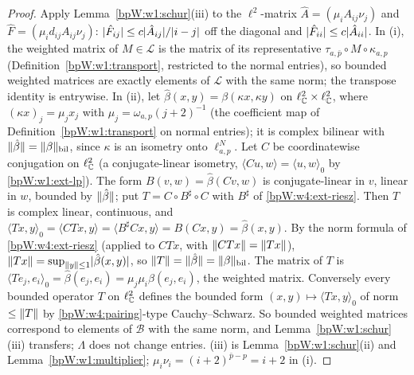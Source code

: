 \begin{proof}
\label{stepW:w4:schurtr}
Apply Lemma~\ref{bpW:w1:schur}(iii) to the $\ell^2$-matrix $\hat A=(\mu_iA_{ij}\nu_j)$ and $\hat F=(\mu_id_{ij}A_{ij}\nu_j)$:
$\lvert \hat F_{ij}\rvert\le c\lvert \hat A_{ij}\rvert/\lvert i-j\rvert$ off the diagonal and $\lvert \hat F_{ii}\rvert\le c\lvert \hat A_{ii}\rvert$.
\label{stepW:w4:schurrep}
In (i), the weighted matrix of $M\in\mathcal L$ is the matrix of its representative
$\tau_{a,\bar p}\circ M\circ\kappa_{a,p}$ (Definition~\ref{bpW:w1:transport}, restricted to the normal entries), so
bounded weighted matrices are exactly elements of $\mathcal L$ with the same norm; the transpose identity is
entrywise. In (ii), let $\hat\beta(x,y)=\beta(\kappa x,\kappa y)$ on $\ell^2_{\mathbb{C}}\times\ell^2_{\mathbb{C}}$, where $(\kappa x)_j=\mu_jx_j$ with
$\mu_j=\omega_{a,p}(j+2)^{-1}$ (the coefficient map of Definition~\ref{bpW:w1:transport} on normal entries); it is complex
bilinear with $\lVert \hat\beta\rVert=\lVert \beta\rVert_{\rm bil}$, since $\kappa$ is an isometry onto $\ell^N_{a,p}$. Let $C$ be
coordinatewise conjugation on $\ell^2_{\mathbb{C}}$ (a conjugate-linear isometry, $\langle Cu,w\rangle=\langle u,w\rangle_0$
by \ref{bpW:w1:ext-lp}). The form $B(v,w)=\hat\beta(Cv,w)$ is conjugate-linear in $v$, linear in $w$, bounded by
$\lVert \hat\beta\rVert$; put $T=C\circ B^\sharp\circ C$ with $B^\sharp$ of \ref{bpW:w4:ext-riesz}. Then $T$ is complex linear,
continuous, and $\langle Tx,y\rangle_0=\langle CTx,y\rangle=\langle B^\sharp Cx,y\rangle=B(Cx,y)=\hat\beta(x,y)$. By the
norm formula of \ref{bpW:w4:ext-riesz} (applied to $CTx$, with $\lVert CTx\rVert=\lVert Tx\rVert$),
$\lVert Tx\rVert=\sup_{\lVert y\rVert\le1}\lvert \hat\beta(x,y)\rvert$, so $\lVert T\rVert=\lVert \hat\beta\rVert=\lVert \beta\rVert_{\rm bil}$. The matrix of $T$ is
$\langle Te_j,e_i\rangle_0=\hat\beta(e_j,e_i)=\mu_j\mu_i\beta(e_j,e_i)$, the weighted matrix. Conversely every bounded
operator $T$ on $\ell^2_{\mathbb{C}}$ defines the bounded form $(x,y)\mapsto\langle Tx,y\rangle_0$ of norm $\le\lVert T\rVert$ by
\eqref{bpW:w4:pairing}-type Cauchy--Schwarz. So bounded weighted matrices correspond to elements of $\mathcal B$ with
the same norm, and Lemma~\ref{bpW:w1:schur}(iii) transfers; $\Lambda$ does not change entries.
\label{stepW:w4:schurdiag}
(iii) is Lemma~\ref{bpW:w1:schur}(ii) and Lemma~\ref{bpW:w1:multiplier}; $\mu_i\nu_i=(i+2)^{\bar p-p}=i+2$ in (i).
\end{proof}

